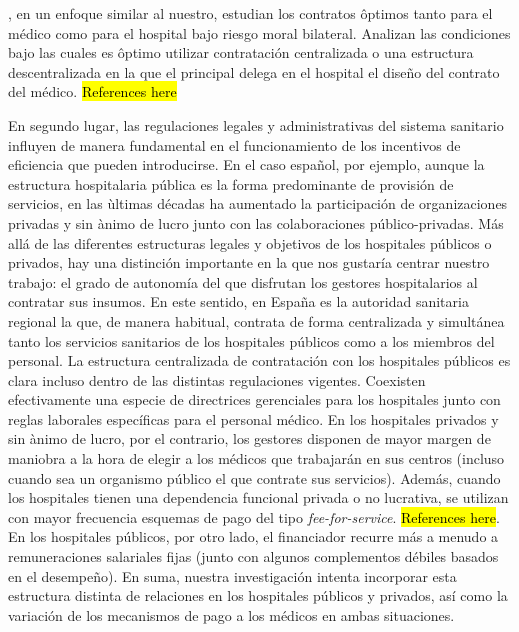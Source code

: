 ﻿\documentclass[12pt,letterpaper]{article}
\begin{document}
\cite{JelovacMacho02}, en un enfoque similar al nuestro, estudian los contratos \^optimos tanto para el m\'edico como para el hospital bajo riesgo moral bilateral. Analizan las condiciones bajo las cuales es \^optimo utilizar contrataci\'on centralizada o una estructura descentralizada en la que el principal delega en el hospital el dise\~no del contrato del m\'edico.
\hl{References here}

En segundo lugar, las regulaciones legales y administrativas del sistema sanitario influyen de manera fundamental en el funcionamiento de los incentivos de eficiencia que pueden introducirse. En el caso espa\~nol, por ejemplo, aunque la estructura hospitalaria p\'ublica es la forma predominante de provisi\'on de servicios, en las \`ultimas d\'ecadas ha aumentado la participaci\'on de organizaciones privadas y sin \`animo de lucro junto con las colaboraciones p\'ublico-privadas. M\'as all\'a de las diferentes estructuras legales y objetivos de los hospitales p\'ublicos o privados, hay una distinci\'on importante en la que nos gustar\'ia centrar nuestro trabajo: el grado de autonom\'ia del que disfrutan los gestores hospitalarios al contratar sus insumos. En este sentido, en Espa\~na es la autoridad sanitaria regional la que, de manera habitual, contrata de forma centralizada y simult\'anea tanto los servicios sanitarios de los hospitales p\'ublicos como a los miembros del personal. La estructura centralizada de contrataci\'on con los hospitales p\'ublicos es clara incluso dentro de las distintas regulaciones vigentes. Coexisten efectivamente una especie de directrices gerenciales para los hospitales junto con reglas laborales espec\'ificas para el personal m\'edico. En los hospitales privados y sin \`animo de lucro, por el contrario, los gestores disponen de mayor margen de maniobra a la hora de elegir a los m\'edicos que trabajar\'an en sus centros (incluso cuando sea un organismo p\'ublico el que contrate sus servicios). Adem\'as, cuando los hospitales tienen una dependencia funcional privada o no lucrativa, se utilizan con mayor frecuencia esquemas de pago del tipo \emph{fee-for-service}. \hl{References here}. En los hospitales p\'ublicos, por otro lado, el financiador recurre m\'as a menudo a remuneraciones salariales fijas (junto con algunos complementos d\'ebiles basados en el desempe\~no). En suma, nuestra investigaci\'on intenta incorporar esta estructura distinta de relaciones en los hospitales p\'ublicos y privados, as\'i como la variaci\'on de los mecanismos de pago a los m\'edicos en ambas situaciones.
\end{document}
